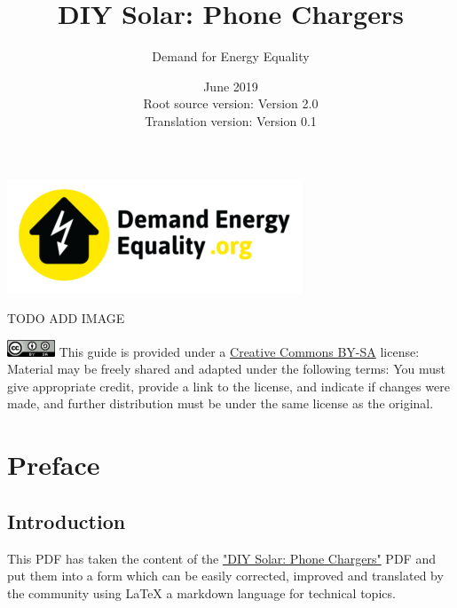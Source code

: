 \documentclass{article}
\title{DIY Solar: Phone Chargers}
\author{Demand for Energy Equality}
\date{June 2019 \\ Root source version: Version 2.0 \\ Translation version: Version 0.1}
\theoremstyle{definition}
\theoremstyle{definition}
\theoremstyle{remark}
\begin{document}
 
\maketitle{}

\begin{center}
  \includegraphics[]{../Images/image_0_0_(demand_energy_equality).png}
\end{center}

TODO ADD IMAGE

\vfill
  
\includegraphics[]{../Images/image_0_2_(license).png} \newline
This guide is provided under a \href{https://creativecommons.org/licenses/by-sa/4.0/legalcode}{Creative Commons BY-SA} license: \newline
Material may be freely shared and adapted under the following terms: You must give appropriate credit, provide a link to the license, and indicate if changes were made, and further distribution must be under the same license as the original.

\newpage

\tableofcontents

\newpage

\section{Preface} %
\label{sec:preface}

  \subsection*{Introduction} %
  \label{sub:introduction}
  
    This PDF has taken the content of the \href{https://www.demandenergyequality.org/build-your-own-panels}{"DIY Solar: Phone Chargers"} PDF and put them into a form which can be easily corrected, improved and translated by the community using LaTeX a markdown language for technical topics.
\end{document}
